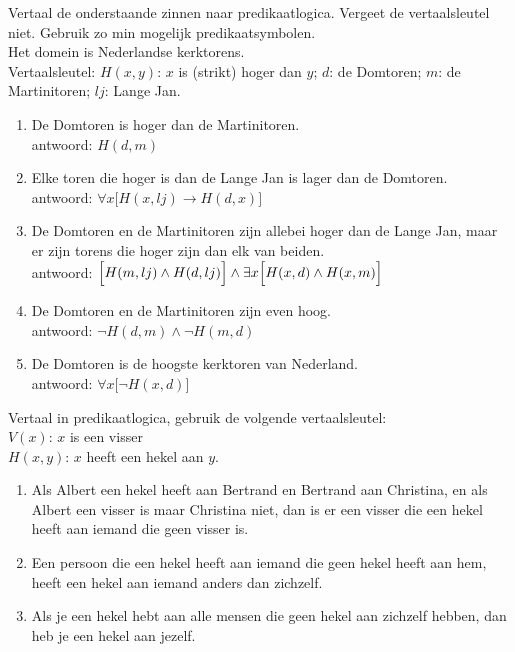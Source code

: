 \begin{answer}
Vertaal de onderstaande zinnen naar predikaatlogica. Vergeet de vertaalsleutel niet. Gebruik zo min mogelijk predikaatsymbolen.\\
Het domein is Nederlandse kerktorens.\\
Vertaalsleutel: $H(x,y)$: $x$ is (strikt) hoger dan $y$; $d$: de Domtoren; $m$: de Martinitoren; $lj$: Lange Jan.
\begin{enumerate}
\item De Domtoren is hoger dan de Martinitoren.\\
antwoord: $H(d,m)$
\item Elke toren die hoger is dan de Lange Jan is lager dan de Domtoren.\\
antwoord: $\forall x\bigl[H(x,lj)\rightarrow H(d,x)\bigr]$
\item De Domtoren en de Martinitoren zijn allebei hoger dan de Lange Jan, maar er zijn torens die hoger zijn dan elk van beiden.\\
antwoord: $\Bigl[H(m,lj)\wedge H(d,lj)\Bigr]\wedge\exists x\Bigl[H(x,d)\wedge H(x,m)\Bigr]$
\item De Domtoren en de Martinitoren zijn even hoog.\\
antwoord: $\neg H(d,m)\wedge\neg H(m,d)$
\item De Domtoren is de hoogste kerktoren van Nederland.\\
antwoord: $\forall x\bigl[\neg H(x,d)\bigr]$
\end{enumerate}
\end{answer}

\begin{answer}
Vertaal in predikaatlogica, gebruik de volgende vertaalsleutel:\\
$V(x)$: $x$ is een visser\\
$H(x,y)$: $x$ heeft een hekel aan $y$.
\begin{enumerate}
    \item Als Albert een hekel heeft aan Bertrand en Bertrand aan Christina, en als Albert een visser is maar Christina niet, dan is er een visser die een hekel heeft aan iemand die geen visser is.
    \item Een persoon die een hekel heeft aan iemand die geen hekel heeft aan hem, heeft een hekel aan iemand anders dan zichzelf.
    \item Als je een hekel hebt aan alle mensen die geen hekel aan zichzelf hebben, dan heb je een hekel aan jezelf.
\end{enumerate}
\end{answer}

